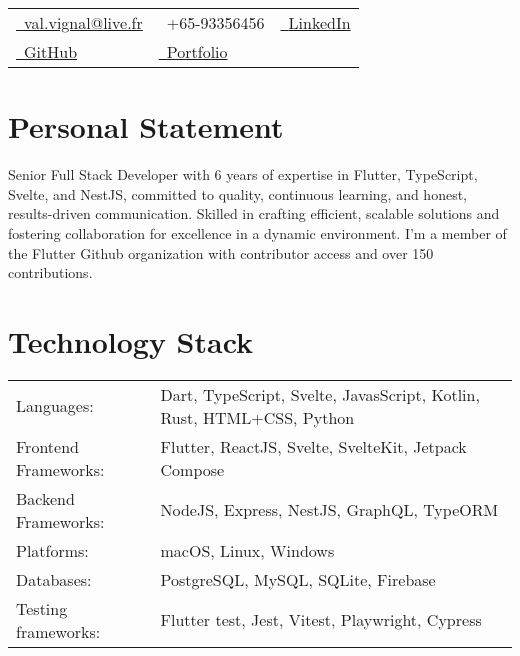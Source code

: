 \documentclass[a4paper,11pt]{article}
\makeatletter
\newcommand{\email}{val.vignal@live.fr}
\makeatother
\begin{document}

\par{\bigskip\par}


\begin{tabularx}{\textwidth}{X X X}
  \href{mailto:\email}{\raisebox{0.0\height}{\footnotesize \faEnvelope}\ {\email}}                   & {\raisebox{0.0\height}{\footnotesize \faPhone}\ +65-93356456}                                                  & \href{https://www.linkedin.com/in/valentin-vignal/}{\raisebox{0.0\height}{\footnotesize \faLinkedin}\ {LinkedIn}} \\
  \href{https://github.com/ValentinVignal}{\raisebox{0.0\height}{\footnotesize \faGithub}\ {GitHub}} & \href{https://valentinvignal.github.io/portfolio/}{\raisebox{0.0\height}{\footnotesize \faGlobe}\ {Portfolio}}                                                                                                                     \\
\end{tabularx}


\section{\textbf{Personal Statement}}
Senior Full Stack Developer with 6 years
of expertise in Flutter, TypeScript, Svelte, and NestJS, committed to quality, continuous
learning, and honest, results-driven communication. Skilled in crafting
efficient, scalable solutions and fostering collaboration for excellence in a
dynamic environment.
I'm a member of the Flutter Github organization with contributor access and over 150
contributions.


\section{\textbf{Technology Stack}}

\begin{tabular}{@{}l l}
  Languages:           & Dart, TypeScript, Svelte, JavasScript, Kotlin, Rust, HTML+CSS, Python \\
  Frontend Frameworks: & Flutter, ReactJS, Svelte, SvelteKit, Jetpack Compose                  \\
  Backend Frameworks:  & NodeJS, Express, NestJS, GraphQL, TypeORM                             \\
  Platforms:           & macOS, Linux, Windows                                                 \\
  Databases:           & PostgreSQL, MySQL, SQLite, Firebase                                   \\
  Testing frameworks:  & Flutter test, Jest, Vitest, Playwright, Cypress                       \\
\end{tabular}
\end{document}
